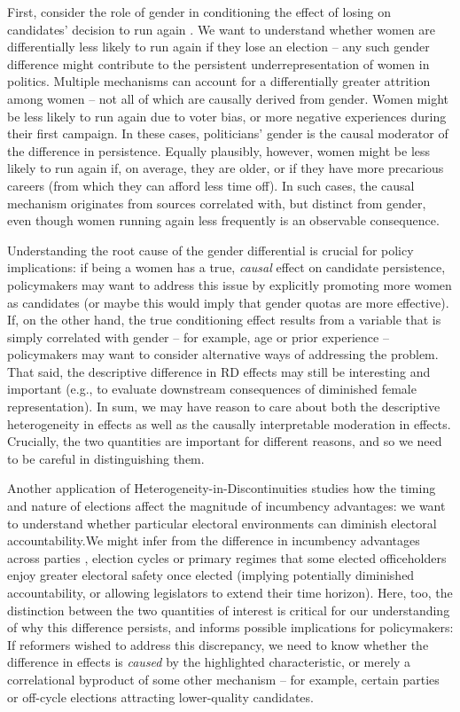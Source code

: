 \documentclass[12pt]{article}
\begin{document}
First, consider the role of gender in conditioning the effect of losing on candidates' decision to run again \citep{wasserman2018, cipullo2021}. We want to understand whether women are differentially less likely to run again if they lose an election -- any such gender difference might contribute to the persistent underrepresentation of women in politics. Multiple mechanisms can account for a differentially greater attrition among women -- not all of which are causally derived from gender. Women might be less likely to run again due to voter bias, or more negative experiences during their first campaign. In these cases, politicians' gender is the causal moderator of the difference in persistence. Equally plausibly, however, women might be less likely to run again if, on average, they are older, or if they have more precarious careers (from which they can afford less time off). In such cases, the causal mechanism originates from sources correlated with, but distinct from gender, even though women running again less frequently is an observable consequence.

Understanding the root cause of the gender differential is crucial for policy implications: if being a women has a true, \emph{causal} effect on candidate persistence, policymakers may want to address this issue by explicitly promoting more women as candidates (or maybe this would imply that gender quotas are more effective). If, on the other hand, the true conditioning effect results from a variable that is simply correlated with gender -- for example, age or prior experience -- policymakers may want to consider alternative ways of addressing the problem. That said, the descriptive difference in RD effects may still be interesting and important (e.g., to evaluate downstream consequences of diminished female representation). In sum, we may have reason to care about both the descriptive heterogeneity in effects as well as the causally interpretable moderation in effects. Crucially, the two quantities are important for different reasons, and so we need to be careful in distinguishing them.

Another application of Heterogeneity-in-Discontinuities studies how the timing and nature of elections affect the magnitude of incumbency advantages: we want to understand whether particular electoral environments can diminish electoral accountability.We might infer from the difference in incumbency advantages across parties \citep{eggers2015}, election cycles \citep{de2018} or primary regimes \citep{olson2020} that some elected officeholders enjoy greater electoral safety once elected (implying potentially diminished accountability, or allowing legislators to extend their time horizon).  Here, too, the distinction between the two quantities of interest is critical for our understanding of why this difference persists, and informs possible implications for policymakers: If reformers wished to address this discrepancy, we need to know whether the difference in effects is \emph{caused} by the highlighted characteristic, or merely a correlational byproduct of some other mechanism -- for example, certain parties or off-cycle elections attracting lower-quality candidates. 
\end{document}
